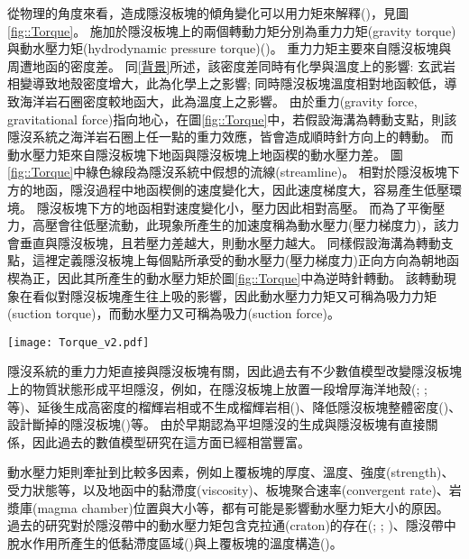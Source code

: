 從物理的角度來看，造成隱沒板塊的傾角變化可以用力矩來解釋(\citealp{stevenson1977angle})，見圖\ref{fig::Torque}。
施加於隱沒板塊上的兩個轉動力矩分別為重力力矩(gravity torque)與動水壓力矩(hydrodynamic pressure torque)(\citealp{McKenzie1969})。
重力力矩主要來自隱沒板塊與周遭地函的密度差。
同\ref{背景}所述，該密度差同時有化學與溫度上的影響: 玄武岩相變導致地殼密度增大，此為化學上之影響; 同時隱沒板塊溫度相對地函較低，導致海洋岩石圈密度較地函大，此為溫度上之影響。
由於重力(gravity force, gravitational force)指向地心，在圖\ref{fig::Torque}中，若假設海溝為轉動支點，則該隱沒系統之海洋岩石圈上任一點的重力效應，皆會造成順時針方向上的轉動。
而動水壓力矩來自隱沒板塊下地函與隱沒板塊上地函楔的動水壓力差。
圖\ref{fig::Torque}中綠色線段為隱沒系統中假想的流線(streamline)。
相對於隱沒板塊下方的地函，隱沒過程中地函楔側的速度變化大，因此速度梯度大，容易產生低壓環境。
隱沒板塊下方的地函相對速度變化小，壓力因此相對高壓。
而為了平衡壓力，高壓會往低壓流動，此現象所產生的加速度稱為動水壓力(壓力梯度力)，該力會垂直與隱沒板塊，且若壓力差越大，則動水壓力越大。
同樣假設海溝為轉動支點，這裡定義隱沒板塊上每個點所承受的動水壓力(壓力梯度力)正向方向為朝地函楔為正，因此其所產生的動水壓力矩於圖\ref{fig::Torque}中為逆時針轉動。
該轉動現象在看似對隱沒板塊產生往上吸的影響，因此動水壓力力矩又可稱為吸力力矩(suction torque)\citealp{tovish1978mantle}，而動水壓力又可稱為吸力(suction force)。

\begin{figure*}[ht!]
    \centering
    \texttt{[image: Torque\_v2.pdf]}
    \caption[隱沒系統中的施加於隱沒板塊上的轉動力矩]{隱沒系統中的施加於隱沒板塊上的轉動力矩，包含重力力矩與動水壓力矩。假設海溝為支點，重力力矩在該系統中施予一順時針方向上的轉動，反之動水壓力矩施予一逆時針方向上的轉動。綠色線為地函中的假想流線。
    }
    \label{fig::Torque}
\end{figure*}

隱沒系統的重力力矩直接與隱沒板塊有關，因此過去有不少數值模型改變隱沒板塊上的物質狀態形成平坦隱沒，例如，在隱沒板塊上放置一段增厚海洋地殼(\citealp{van2002role}; \citealp{Liu2016}; \citealp{Hu2016}等)、延後生成高密度的榴輝岩相或不生成榴輝岩相(\citealp{van2002role})、降低隱沒板塊整體密度(\citealp{Gerya2009})、設計斷掉的隱沒板塊(\citealp{Liu2016})等。
由於早期認為平坦隱沒的生成與隱沒板塊有直接關係，因此過去的數值模型研究在這方面已經相當豐富。

動水壓力矩則牽扯到比較多因素，例如上覆板塊的厚度、溫度、強度(strength)、受力狀態等，以及地函中的黏滯度(viscosity)、板塊聚合速率(convergent rate)、岩漿庫(magma chamber)位置與大小等，都有可能是影響動水壓力矩大小的原因。
過去的研究對於隱沒帶中的動水壓力矩包含克拉通(craton)的存在(\citealp{Manea2012Chile}; \citealp{Liu2016}; \citealp{Hu2016})、隱沒帶中脫水作用所產生的低黏滯度區域(\citealp{Manea2007})與上覆板塊的溫度構造(\citealp{Thermal2012})。

